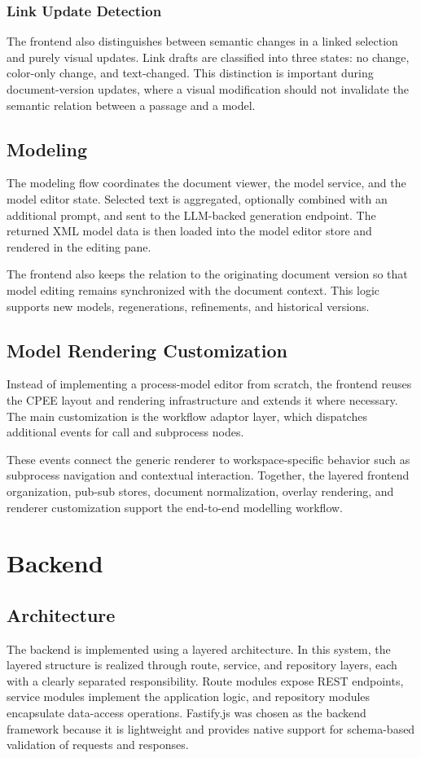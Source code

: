 \subsubsection{Link Update Detection}
The frontend also distinguishes between semantic changes in a linked selection and purely visual updates. Link drafts are classified into three states: no change, color-only change, and text-changed. This distinction is important during document-version updates, where a visual modification should not invalidate the semantic relation between a passage and a model.

\subsection{Modeling}
The modeling flow coordinates the document viewer, the model service, and the model editor state. Selected text is aggregated, optionally combined with an additional prompt, and sent to the LLM-backed generation endpoint. The returned XML model data is then loaded into the model editor store and rendered in the editing pane.

The frontend also keeps the relation to the originating document version so that model editing remains synchronized with the document context. This logic supports new models, regenerations, refinements, and historical versions.

\subsection{Model Rendering Customization}
Instead of implementing a process-model editor from scratch, the frontend reuses the CPEE layout and rendering infrastructure and extends it where necessary. The main customization is the workflow adaptor layer, which dispatches additional events for call and subprocess nodes.

These events connect the generic renderer to workspace-specific behavior such as subprocess navigation and contextual interaction. Together, the layered frontend organization, pub-sub stores, document normalization, overlay rendering, and renderer customization support the end-to-end modelling workflow.

\section{Backend}
\subsection{Architecture}
The backend is implemented using a layered architecture. In this system, the layered structure is realized through route, service, and repository layers, each with a clearly separated responsibility. Route modules expose REST endpoints, service modules implement the application logic, and repository modules encapsulate data-access operations. Fastify.js was chosen as the backend framework because it is lightweight and provides native support for schema-based validation of requests and responses. 

